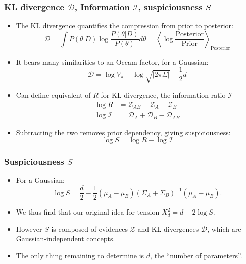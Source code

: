 \documentclass[aspectratio=169, handout]{beamer}
\begin{document}
\begin{frame}
    \frametitle{KL divergence $\mathcal{D}$, Information $\mathcal{I}$, suspiciousness $S$}
    \begin{itemize}
        \item The KL divergence quantifies the compression from prior to posterior:
            \[
                \mathcal{D} = \int P(\theta|D) \log \frac{P(\theta|D)}{P(\theta)} d\theta = \left\langle\log\frac{\text{Posterior}}{\text{Prior}}\right\rangle_\text{Posterior}
            \]
        \item It bears many similarities to an Occam factor, for a Gaussian:
            \[
                \mathcal{D} =   \log V_\pi - \log \sqrt{|2\pi\Sigma|} - \frac{1}{2}d
            \]
        \item Can define equivalent of $R$ for KL divergence, the information ratio $\mathcal{I}$
            \begin{align}
                \log R &= \mathcal{Z}_{AB} -\mathcal{Z}_A - \mathcal{Z}_B \nonumber\\
                \log \mathcal{I} &= \mathcal{D}_A + \mathcal{D}_B - \mathcal{D}_{AB} \nonumber
            \end{align}
        \item Subtracting the two removes prior dependency, giving suspiciousness:
            \[
                \log S = \log R - \log \mathcal{I}
            \]
    \end{itemize}

\end{frame}

\begin{frame}
    \frametitle{Suspiciousness $S$}
    \begin{itemize}
        \item For a Gaussian:
            \[
                \log S = \frac{d}{2}  -\frac{1}{2} (\mu_A-\mu_B){(\Sigma_{A}+\Sigma_{B})}^{-1}(\mu_A-\mu_B).
            \]
        \item We thus find that our original idea for tension $X^2_d=d-2\log S$.
        \item However $S$ is composed of evidences $\mathcal{Z}$ and KL divergences $\mathcal{D}$, which are Gaussian-independent concepts.
        \item The only thing remaining to determine is $d$, the ``number of parameters''.
    \end{itemize}

\end{frame}
\end{document}
